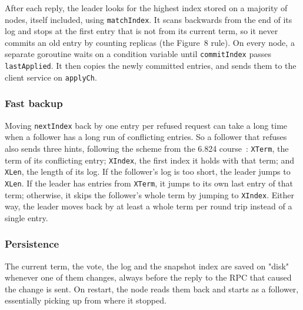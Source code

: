 \documentclass[conference]{IEEEtran}
\begin{document}
After each reply, the leader looks for the highest index stored on a majority of nodes, itself included, using \texttt{matchIndex}. It scans backwards from the end of its log and stops at the first entry that is not from its current term, so it never commits an old entry by counting replicas (the Figure~8 rule). On every node, a separate goroutine waits on a condition variable until \texttt{commitIndex} passes \texttt{lastApplied}. It then copies the newly committed entries, and sends them to the client service on \texttt{applyCh}.

\subsubsection{\textbf{Fast backup}} Moving \texttt{nextIndex} back by one entry per refused request can take a long time when a follower has a long run of conflicting entries. So a follower that refuses also sends three hints, following the scheme from the 6.824 course~\cite{mit6824}: \texttt{XTerm}, the term of its conflicting entry; \texttt{XIndex}, the first index it holds with that term; and \texttt{XLen}, the length of its log. If the follower's log is too short, the leader jumps to \texttt{XLen}. If the leader has entries from \texttt{XTerm}, it jumps to its own last entry of that term; otherwise, it skips the follower's whole term by jumping to \texttt{XIndex}. Either way, the leader moves back by at least a whole term per round trip instead of a single entry.

\subsubsection{\textbf{Persistence}} The current term, the vote, the log and the snapshot index are saved on "disk" whenever one of them changes, always before the reply to the RPC that caused the change is sent. On restart, the node reads them back and starts as a follower, essentially picking up from where it stopped.
\end{document}
